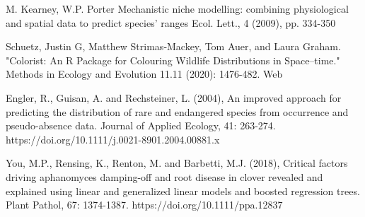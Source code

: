 \documentclass[12pt,a4paper]{article}
\begin{document}
\begin{thebibliography}{999}
M. Kearney, W.P. Porter
Mechanistic niche modelling: combining physiological and spatial data to predict species’ ranges
Ecol. Lett., 4 (2009), pp. 334-350

Schuetz, Justin G, Matthew Strimas‐Mackey, Tom Auer, and Laura Graham. "Colorist: An R Package for Colouring Wildlife Distributions in Space–time." Methods in Ecology and Evolution 11.11 (2020): 1476-482. Web


Engler, R., Guisan, A. and Rechsteiner, L. (2004), An improved approach for predicting the distribution of rare and endangered species from occurrence and pseudo-absence data. Journal of Applied Ecology, 41: 263-274. https://doi.org/10.1111/j.0021-8901.2004.00881.x

You, M.P., Rensing, K., Renton, M. and Barbetti, M.J. (2018), Critical factors driving aphanomyces damping-off and root disease in clover revealed and explained using linear and generalized linear models and boosted regression trees. Plant Pathol, 67: 1374-1387. https://doi.org/10.1111/ppa.12837



\end{thebibliography}
\end{document}
